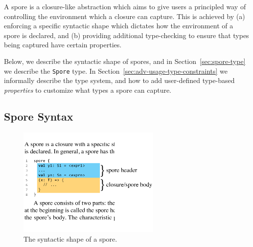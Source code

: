 \documentclass{llncs}
\begin{document}

A spore is a closure-like abstraction which aims to give users a principled way
of controlling the environment which a closure can capture. This is achieved
by (a) enforcing a specific syntactic shape which dictates how the environment
of a spore is declared, and (b) providing additional type-checking to ensure
that types being captured have certain properties.




Below, we describe the syntactic shape of spores, and in
Section~\ref{sec:spore-type} we describe the \verb|Spore| type.
In Section~\ref{sec:adv-usage-type-constraints} we informally describe the type
system, and how to add user-defined type-based {\em properties} to
customize what types a spore can capture.

\vspace{1mm}
\subsection{Spore Syntax}
\label{sec:spore-syntax}

\setlength{\belowcaptionskip}{-6pt}
\begin{figure}[t!]
\centering
\includegraphics[width=7cm]{spore-shape.pdf}
\vspace{-0.4cm}
\caption{The syntactic shape of a spore.}
\label{fig:spore-shape}
\end{figure}
\setlength{\belowcaptionskip}{0pt}
\end{document}
